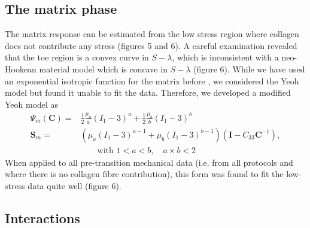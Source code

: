         
\subsection{The matrix phase}

    The matrix response can be estimated from the low stress region where collagen does not contribute any stress (figures 5 and 6). A careful examination revealed that the toe region is a convex curve in $S-\lambda$, which is inconsistent with a neo-Hookean material model which is concave in $S-\lambda$ (figure 6). While we have used an exponential isotropic function for the matrix before \cite{sacks_structural_2000}, we considered the Yeoh model but found it unable to fit the data. Therefore, we developed a modified Yeoh model as
        \begin{equation}\label{c3:eqn:48}
        \begin{aligned}
        \Psi_m(\mathbf{C}) =& \frac{1}{2}\frac{\mu_a}{a}(I_1 - 3)^a + \frac{1}{2}\frac{\mu_b}{b}(I_1 - 3)^b  \\
        \mathbf{S}_m =& \left(\mu_a(I_1 - 3)^{a-1} + \mu_b(I_1 - 3)^{b-1}\right)(\mathbf{I} - C_{33}\mathbf{C}^{-1}), \\
        &\quad\quad \text{with } 1<a<b, \quad a\times b < 2
        \end{aligned}
        \end{equation}
    When applied to all pre-transition mechanical data (i.e. from all protocols and where there is no collagen fibre contribution), this form was found to fit the low-stress data quite well (figure 6).
    
    
    
    
\subsection{Interactions}
        
